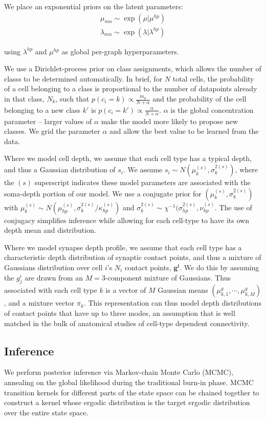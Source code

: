 \documentclass{article}
\renewcommand{\vec}[1]{\mathbf{#1}}
\begin{document}
We place an exponential priors on the latent parameters:
\begin{eqnarray}
 \mu_{mn} \sim \exp(\mu | \mu^{hp}) \\
\lambda_{mn} \sim \exp(\lambda | \lambda^{hp})
\end{eqnarray}

using  $\lambda^{hp}$ and $\mu^{hp}$ as global per-graph hyperparameters. 

We use a Dirichlet-process prior on class assignments, which allows
the number of classs to be determined automatically. In brief, for $N$
total cells, the probability of a cell belonging to a class is
proportional to the number of datapoints already in that class, $N_k$,
such that $p(c_i = k) \propto \frac{m_k}{N + \alpha}$ and the
probability of the cell belonging to a new class $k'$ is $p(c_i = k')
\propto \frac{\alpha}{N + \alpha}$. $\alpha$ is the global
concentration parameter -- larger values of $\alpha$ make the model
more likely to propose new classes. We grid the parameter $\alpha$ and
allow the best value to be learned from the data.


Where we model cell depth, we assume that 
each cell type has a typical depth, and thus a Gaussian distribution
of $s_i$. We assume $s_i \sim N(\mu^{(s)}_k,
\sigma^{2(s)}_k)$, where the $(s)$ superscript indicates
these model parameters are associated with the soma-depth 
portion of our model.  We use a conjugate prior for $(\mu^{(s)}_k, \sigma^{2(s)}_k)$ with
$\mu^{(s)}_k \sim N(\mu^{(s)}_{hp}, \sigma^{2(s)}_k/ \kappa^{(s)}_{hp})$ and $\sigma^{2(s)}_k \sim
\chi^{-1}(\sigma^{2(s)}_{hp}, \nu^{(s)}_{hp}$. The use of conjugacy simplifies inference while allowing for each cell-type to have its own depth mean and distribution. 

Where we model synapse depth profile, we assume that each cell
type has a characteristic depth distribution of synaptic contact points, and thus
a mixture of Gaussians distribution over cell $i$’s $N_i$ contact points, $\vec{g^i}$.
We do this by assuming the $g^i_j$
are drawn from an $M=3$-component mixture of Gaussians. Thus associated with each cell type $k$ is a vector
of $M$ Gaussian means $(\mu^g_{k,1}, \cdots, \mu^g_{k, M})$, and a
mixture vector $\pi_k$.  This representation can thus model depth distributions of contact points that have up to three modes, an assumption that is well matched in the bulk of anatomical studies of cell-type dependent connectivity.


\subsection{Inference} 
We perform posterior inference via Markov-chain Monte Carlo (MCMC),
annealing on the global likelihood during the traditional burn-in
phase. MCMC transition kernels for different parts of the state space
can be chained together to construct a kernel whose ergodic
distribution is the target ergodic distribution over the entire state space. 
\end{document}

